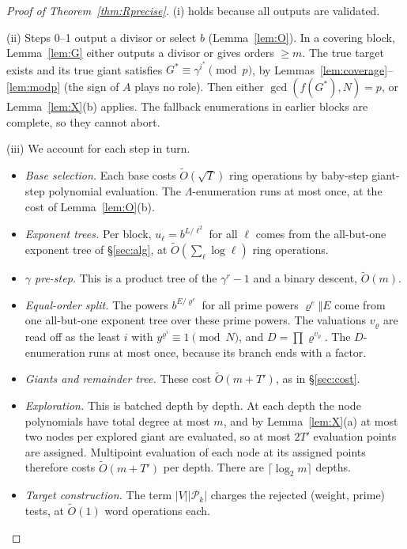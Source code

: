 \documentclass[11pt]{amsart}
\theoremstyle{definition}
\begin{document}
\begin{proof}[Proof of Theorem~\ref{thm:Rprecise}]
(i) holds because all outputs are validated.

(ii) Steps 0--1 output a divisor or select $b$ (Lemma~\ref{lem:O}). In a covering block,
Lemma~\ref{lem:G} either outputs a divisor or gives orders $\ge m$. The true target exists and its
true giant satisfies $G^*\equiv\gamma^{i^*}\pmod p$, by Lemmas~\ref{lem:coverage}--\ref{lem:modp}
(the sign of $A$ plays no role). Then either $\gcd(f(G^*),N)=p$, or Lemma~\ref{lem:X}(b) applies.
The fallback enumerations in earlier blocks are complete, so they cannot abort.

(iii) We account for each step in turn.
\begin{itemize}
\item \emph{Base selection.} Each base costs $\tilde O(\sqrt T)$ ring operations by baby-step
  giant-step polynomial evaluation. The $\Lambda$-enumeration runs at most once, at the cost of
  Lemma~\ref{lem:O}(b).
\item \emph{Exponent trees.} Per block, $u_\ell=b^{L/\ell^2}$ for all $\ell$ comes from the
  all-but-one exponent tree of \S\ref{sec:alg}, at $\tilde O(\sum_\ell\log\ell)$ ring
  operations.
\item \emph{$\gamma$ pre-step.} This is a product tree of the $\gamma^r-1$ and a binary descent,
  $\tilde O(m)$.
\item \emph{Equal-order split.} The powers $b^{E/\varrho^e}$ for all prime powers
  $\varrho^e\Vert E$ come from one all-but-one exponent tree over these prime powers. The
  valuations $v_\varrho$ are read off as the least $i$ with $y^{\varrho^i}\equiv1\pmod N$, and
  $D=\prod\varrho^{v_\varrho}$. The $D$-enumeration runs at most once, because its branch ends
  with a factor.
\item \emph{Giants and remainder tree.} These cost $\tilde O(m+T')$, as in \S\ref{sec:cost}.
\item \emph{Exploration.} This is batched depth by depth. At each depth the node polynomials
  have total degree at most $m$, and by Lemma~\ref{lem:X}(a) at most two nodes per explored giant
  are evaluated, so at most $2T'$ evaluation points are assigned. Multipoint evaluation of each
  node at its assigned points therefore costs $\tilde O(m+T')$ per depth. There are
  $\lceil\log_2m\rceil$ depths.
\item \emph{Target construction.} The term $|V||\mathcal P_k|$ charges the rejected (weight,
  prime) tests, at $\tilde O(1)$ word operations each.
\end{itemize}
\end{proof}
\end{document}
